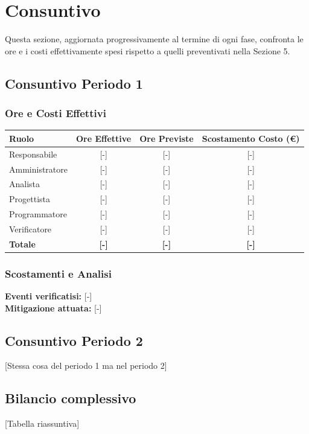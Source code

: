 \section{Consuntivo}
Questa sezione, aggiornata progressivamente al termine di ogni fase, confronta le ore e i costi effettivamente spesi rispetto a quelli preventivati nella Sezione 5.

\subsection{Consuntivo Periodo 1}

\subsubsection{Ore e Costi Effettivi}
\begin{table}[ht]
	\centering
	\renewcommand{\arraystretch}{1.3}
	\begin{tabularx}{\textwidth}{X c c c}
		\toprule
		\textbf{Ruolo} & \textbf{Ore Effettive} & \textbf{Ore Previste} & \textbf{Scostamento Costo (\euro)} \\
		\midrule
		Responsabile & [-] & [-] & [-] \\
		Amministratore & [-] & [-] & [-] \\
		Analista & [-] & [-] & [-] \\
		Progettista & [-] & [-] & [-] \\
		Programmatore & [-] & [-] & [-] \\
		Verificatore & [-] & [-] & [-] \\
		\midrule
		\textbf{Totale} & \textbf{[-]} & \textbf{[-]} & \textbf{[-]} \\
		\bottomrule
	\end{tabularx}
\end{table}

\subsubsection{Scostamenti e Analisi}
\textbf{Eventi verificatisi:} [-]  
\\
\textbf{Mitigazione attuata:} [-]

\subsection{Consuntivo Periodo 2}
{[Stessa cosa del periodo 1 ma nel periodo 2]}

\subsection{Bilancio complessivo}
{[Tabella riassuntiva]}
